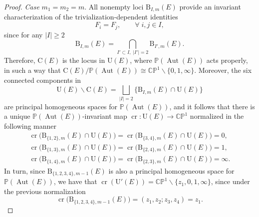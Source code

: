 \documentclass[pdftex]{sigma}
\newcommand{\field}[1]{\ensuremath{\mathbb{#1}}}
\newcommand{\CC}{\field{C}}
\newcommand{\PP}{\field{P}}
\DeclareMathOperator{\Aut}{Aut}
\numberwithin{equation}{section}
\begin{document}
\begin{proof}
\noindent \textit{Case} $m_{1} = m_{2} = m$. All nonempty loci $\mathrm{B}_{I,m}(E)$ provide an invariant characterization of the trivialization-dependent identities
\[
F_{i}=F_{j},\qquad \forall\; i,j\in I,
\]
since for any $\vert I \vert \geq 2$
\[
\mathrm{B}_{I,m}(E) = \bigcap_{I'\subset I,\; \vert I'\vert =2} \mathrm{B}_{I',m}(E).
\]
Therefore, $\mathrm{C}(E)$ is the locus in $\mathrm{U}(E)$, where $\PP(\Aut(E))$ acts properly, in such a way that $\mathrm{C}(E)/\PP(\Aut(E))\cong \CC\PP^{1}\backslash\{0,1,\infty\}$. Moreover, the six connected components in
\[
\mathrm{U}(E)\backslash\mathrm{C}(E) = \bigsqcup_{\vert I\vert =2} \bigl\{\mathrm{B}_{I,m}(E)\cap\mathrm{U}(E)\bigr\}
\]
are principal homogeneous spaces for $\PP(\Aut(E))$, and it follows that there is a unique $\PP(\Aut(E))$-invariant map $\operatorname{cr}\colon \mathrm{U}(E)\rightarrow \CC\PP^{1}$ normalized in the following manner
\begin{gather*}
\operatorname{cr}\bigl(\mathrm{B}_{\{1,2\},m}(E)\cap\mathrm{U}(E)\bigr) = \operatorname{cr}\bigl(\mathrm{B}_{\{3,4\},m}(E)\cap\mathrm{U}(E)\bigr) = 0,
\\
\operatorname{cr}\bigl(\mathrm{B}_{\{1,3\},m}(E)\cap\mathrm{U}(E)\bigr) = \operatorname{cr}\bigl(\mathrm{B}_{\{2,4\},m}(E)\cap\mathrm{U}(E)\bigr) = 1,
\\
\operatorname{cr}\bigl(\mathrm{B}_{\{1,4\},m}(E)\cap\mathrm{U}(E)\bigr) = \operatorname{cr}\bigl(\mathrm{B}_{\{2,3\},m}(E)\cap\mathrm{U}(E)\bigr) = \infty.
\end{gather*}
In turn, since $ \mathrm{B}_{\{1,2,3,4\},m-1}(E)$ is also a principal homogeneous space for $\PP(\Aut(E))$, we have that $\operatorname{cr}(\mathrm{U}'(E)) = \CC\PP^{1}\backslash\{z_{1},0,1,\infty\}$, since under the previous
normalization
\[
\operatorname{cr}\bigl(\mathrm{B}_{\{1,2,3,4\},m-1}(E)\bigr) = (z_{1},z_{2};z_{3},z_{4}) =z_{1}.
\]


\end{proof}
\end{document}
